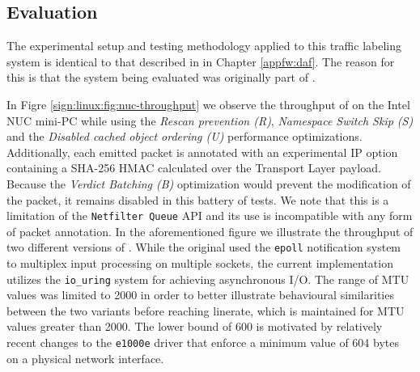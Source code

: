 \subsection{Evaluation}
\label{sign:linux:evaluation}

The experimental setup and testing methodology applied to this traffic labeling system is identical to that described in in Chapter \ref{appfw:daf}. The reason for this is that the system being evaluated was originally part of \daf{}.



In Figre \ref{sign:linux:fig:nuc-throughput} we observe the throughput of \daf{} on the Intel NUC mini-PC while using the \textit{Rescan prevention (R)}, \textit{Namespace Switch Skip (S)} and the \textit{Disabled cached object ordering (U)} performance optimizations. Additionally, each emitted packet is annotated with an experimental IP option containing a SHA-256 HMAC calculated over the Transport Layer payload. Because the \textit{Verdict Batching (B)} optimization would prevent the modification of the packet, it remains disabled in this battery of tests. We note that this is a limitation of the \texttt{Netfilter Queue} API and its use is incompatible with any form of packet annotation. In the aforementioned figure we illustrate the throughput of two different versions of \daf{}. While the original used the \texttt{epoll} notification system to multiplex input processing on multiple sockets, the current implementation utilizes the \texttt{io\_uring} system for achieving asynchronous I/O. The range of MTU values was limited to 2000 in order to better illustrate behavioural similarities between the two variants before reaching linerate, which is maintained for MTU values greater than 2000. The lower bound of 600 is motivated by relatively recent changes to the \texttt{e1000e} driver that enforce a minimum value of 604 bytes on a physical network interface.




